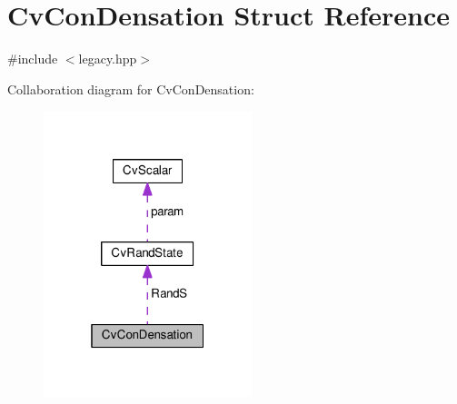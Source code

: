 \hypertarget{structCvConDensation}{\section{Cv\-Con\-Densation Struct Reference}
\label{structCvConDensation}
}


{\ttfamily \#include $<$legacy.\-hpp$>$}



Collaboration diagram for Cv\-Con\-Densation\-:\nopagebreak
\begin{figure}[H]
\begin{center}
\leavevmode
\includegraphics[width=172pt]{structCvConDensation__coll__graph}
\end{center}
\end{figure}

